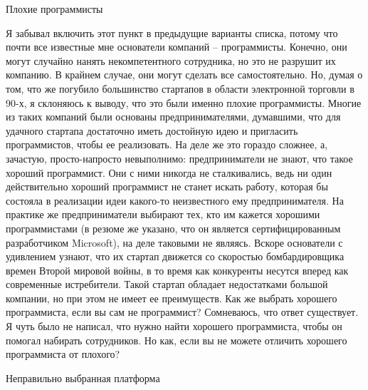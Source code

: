 \documentclass[ebook,12pt,oneside,openany]{memoir}
\begin{document}
Плохие программисты

Я забывал включить этот пункт в предыдущие варианты списка, потому что
почти все известные мне основатели компаний – программисты. Конечно,
они могут случайно нанять некомпетентного сотрудника, но это не
разрушит их компанию. В крайнем случае, они могут сделать все
самостоятельно. Но, думая о том, что же погубило большинство стартапов
в области электронной торговли в 90-х, я склоняюсь к выводу, что это
были именно плохие программисты. Многие из таких компаний были
основаны предпринимателями, думавшими, что для удачного стартапа
достаточно иметь достойную идею и пригласить программистов, чтобы ее
реализовать. На деле же это гораздо сложнее, а, зачастую,
просто-напросто невыполнимо: предприниматели не знают, что такое
хороший программист. Они с ними никогда не сталкивались, ведь ни один
действительно хороший программист не станет искать работу, которая бы
состояла в реализации идеи какого-то неизвестного ему предпринимателя.
На практике же предприниматели выбирают тех, кто им кажется хорошими
программистами (в резюме же указано, что он является сертифицированным
разработчиком Microsoft), на деле таковыми не являясь. Вскоре
основатели с удивлением узнают, что их стартап движется со скоростью
бомбардировщика времен Второй мировой войны, в то время как конкуренты
несутся вперед как современные истребители. Такой стартап обладает
недостатками большой компании, но при этом не имеет ее преимуществ.
Как же выбрать хорошего программиста, если вы сам не программист?
Сомневаюсь, что ответ существует. Я чуть было не написал, что нужно
найти хорошего программиста, чтобы он помогал набирать сотрудников. Но
как, если вы не можете отличить хорошего программиста от плохого?

Неправильно выбранная платформа
\end{document}
